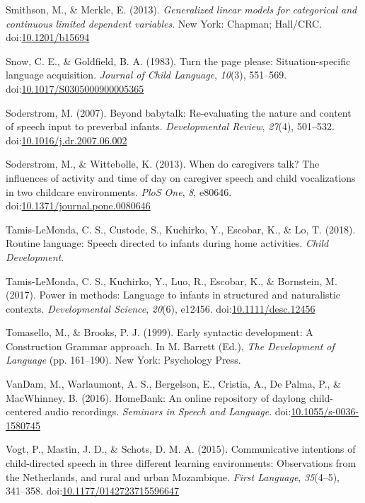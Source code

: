 \documentclass[floatsintext,man]{apa6}
\theoremstyle{definition}
\theoremstyle{definition}
\theoremstyle{definition}
\theoremstyle{remark}
\begin{document}
\hypertarget{ref-smithson2013generalized}{}
Smithson, M., \& Merkle, E. (2013). \emph{Generalized linear models for
categorical and continuous limited dependent variables}. New York:
Chapman; Hall/CRC.
doi:\href{https://doi.org/10.1201/b15694}{10.1201/b15694}

\hypertarget{ref-snow1983turn}{}
Snow, C. E., \& Goldfield, B. A. (1983). Turn the page please:
Situation-specific language acquisition. \emph{Journal of Child
Language}, \emph{10}(3), 551--569.
doi:\href{https://doi.org/10.1017/S0305000900005365}{10.1017/S0305000900005365}

\hypertarget{ref-soderstrom2007beyond}{}
Soderstrom, M. (2007). Beyond babytalk: Re-evaluating the nature and
content of speech input to preverbal infants. \emph{Developmental
Review}, \emph{27}(4), 501--532.
doi:\href{https://doi.org/10.1016/j.dr.2007.06.002}{10.1016/j.dr.2007.06.002}

\hypertarget{ref-soderstrom2013when}{}
Soderstrom, M., \& Wittebolle, K. (2013). When do caregivers talk? The
influences of activity and time of day on caregiver speech and child
vocalizations in two childcare environments. \emph{PloS One}, \emph{8},
e80646.
doi:\href{https://doi.org/10.1371/journal.pone.0080646}{10.1371/journal.pone.0080646}

\hypertarget{ref-tamis2018routine}{}
Tamis-LeMonda, C. S., Custode, S., Kuchirko, Y., Escobar, K., \& Lo, T.
(2018). Routine language: Speech directed to infants during home
activities. \emph{Child Development}.

\hypertarget{ref-tamislemonda2017power}{}
Tamis-LeMonda, C. S., Kuchirko, Y., Luo, R., Escobar, K., \& Bornstein,
M. (2017). Power in methods: Language to infants in structured and
naturalistic contexts. \emph{Developmental Science}, \emph{20}(6),
e12456.
doi:\href{https://doi.org/10.1111/desc.12456}{10.1111/desc.12456}

\hypertarget{ref-tomasello1999early}{}
Tomasello, M., \& Brooks, P. J. (1999). Early syntactic development: A
Construction Grammar approach. In M. Barrett (Ed.), \emph{The
Development of Language} (pp. 161--190). New York: Psychology Press.

\hypertarget{ref-HomeBank}{}
VanDam, M., Warlaumont, A. S., Bergelson, E., Cristia, A., De Palma, P.,
\& MacWhinney, B. (2016). HomeBank: An online repository of daylong
child-centered audio recordings. \emph{Seminars in Speech and Language}.
doi:\href{https://doi.org/10.1055/s-0036-1580745}{10.1055/s-0036-1580745}

\hypertarget{ref-vogt2015communicative}{}
Vogt, P., Mastin, J. D., \& Schots, D. M. A. (2015). Communicative
intentions of child-directed speech in three different learning
environments: Observations from the Netherlands, and rural and urban
Mozambique. \emph{First Language}, \emph{35}(4--5), 341--358.
doi:\href{https://doi.org/10.1177/0142723715596647}{10.1177/0142723715596647}
\end{document}
